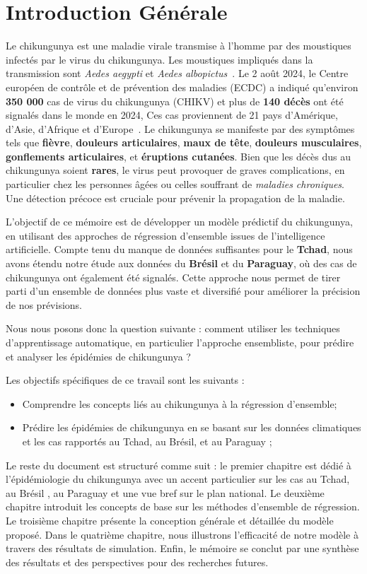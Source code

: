 \chapter*{Introduction Générale}
Le chikungunya est une maladie virale transmise à l'homme par des moustiques infectés par le virus du chikungunya. Les moustiques impliqués dans la transmission sont \textit{Aedes aegypti} et \textit{Aedes albopictus}~\cite{intro}. Le 2 août 2024, le Centre européen de contrôle et de prévention des maladies (ECDC) a indiqué qu'environ \textbf{350 000} cas de virus du chikungunya (CHIKV) et plus de \textbf{140 décès} ont été signalés dans le monde en 2024, Ces cas proviennent de 21 pays d'Amérique, d'Asie, d'Afrique et d'Europe~\cite{chikvecdc}. Le chikungunya se manifeste par des symptômes tels que \textbf{fièvre}, \textbf{douleurs articulaires}, \textbf{maux de tête}, \textbf{douleurs musculaires}, \textbf{gonflements articulaires}, et \textbf{éruptions cutanées}. Bien que les décès dus au chikungunya soient \textbf{rares}, le virus peut provoquer de graves complications, en particulier chez les personnes âgées ou celles souffrant de \textit{maladies chroniques}. Une détection précoce est cruciale pour prévenir la propagation de la maladie.

L'objectif de ce mémoire est de développer un modèle prédictif du chikungunya, en utilisant des approches de régression d'ensemble issues de l'intelligence artificielle. Compte tenu du manque de données suffisantes pour le \textbf{Tchad}, nous avons étendu notre étude aux données du \textbf{Brésil} et du \textbf{Paraguay}, où des cas de chikungunya ont également été signalés. Cette approche nous permet de tirer parti d'un ensemble de données plus vaste et diversifié pour améliorer la précision de nos prévisions.

Nous nous posons donc la question suivante : comment utiliser les techniques d'apprentissage automatique, en particulier l'approche ensembliste, pour prédire et analyser les épidémies de chikungunya ?

Les objectifs spécifiques de ce travail sont les suivants :
\begin{itemize}
	\item Comprendre les concepts liés au chikungunya à la régression d'ensemble;
	\item Prédire les épidémies de chikungunya en se basant sur les données climatiques et les cas rapportés au Tchad, au Brésil, et au Paraguay ;
\end{itemize}

Le reste du document est structuré comme suit : le premier chapitre est dédié à l'épidémiologie du chikungunya avec un accent particulier sur les cas au Tchad, au Brésil , au Paraguay et une vue bref sur le plan national. Le deuxième chapitre introduit les concepts de base sur les méthodes d'ensemble de régression. Le troisième chapitre présente la conception générale et détaillée du modèle proposé. Dans le quatrième chapitre, nous illustrons l'efficacité de notre modèle à travers des résultats de simulation. Enfin, le mémoire se conclut par une synthèse des résultats et des perspectives pour des recherches futures.

